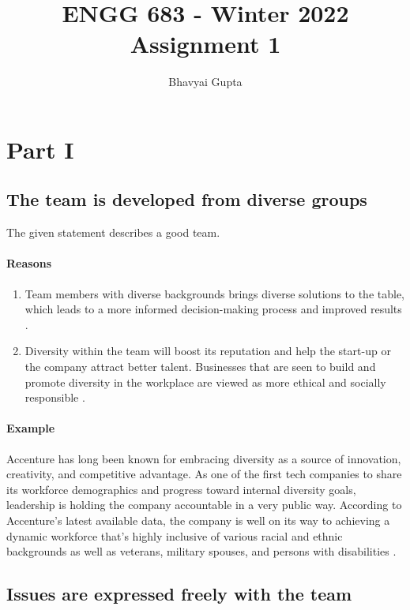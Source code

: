 \documentclass{article}
\title{ENGG 683 - Winter 2022\\ Assignment 1}
\author{Bhavyai Gupta}
\date{}
\begin{document}
\maketitle

\section{Part I}

\subsection{The team is developed from diverse groups}

The given statement describes a good team.

\paragraph{Reasons}

\begin{enumerate}
\item Team members with diverse backgrounds brings diverse solutions to the table, which leads to a more informed decision-making process and improved results \cite{diversityBenefits}.

\item Diversity within the team will boost its reputation and help the start-up or the company attract better talent. Businesses that are seen to build and promote diversity in the workplace are viewed as more ethical and socially responsible \cite{diversityBenefits}.
\end{enumerate}

\paragraph{Example}
Accenture has long been known for embracing diversity as a source of innovation, creativity, and competitive advantage. As one of the first tech companies to share its workforce demographics and progress toward internal diversity goals, leadership is holding the company accountable in a very public way. According to Accenture’s latest available data, the company is well on its way to achieving a dynamic workforce that’s highly inclusive of various racial and ethnic backgrounds as well as veterans, military spouses, and persons with disabilities \cite{accentureDemographics}.

\subsection{Issues are expressed freely with the team}
\end{document}

